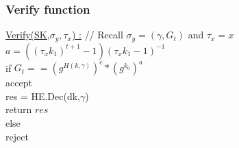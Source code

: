 \subsubsection{Verify function}
\underline{Verify(SK,$\sigma_y, \tau_x$) :} // Recall $\sigma_y = (\gamma, G_t) $ and $\tau_x = x$
\tabNormal $a= ((\tau_x  k_1)^{t+1}-1)(\tau_x k_1 - 1)^{-1}$ \\
\tabNormal if $G_t  == (g^{H(k, \gamma)})^c * (g^{k_0})^a$ \\
\tabOne accept \\
\tabOne res = HE.Dec(dk,$\gamma$) \\
\tabOne return $res$  \\
\tabNormal else \\
\tabOne reject \\
